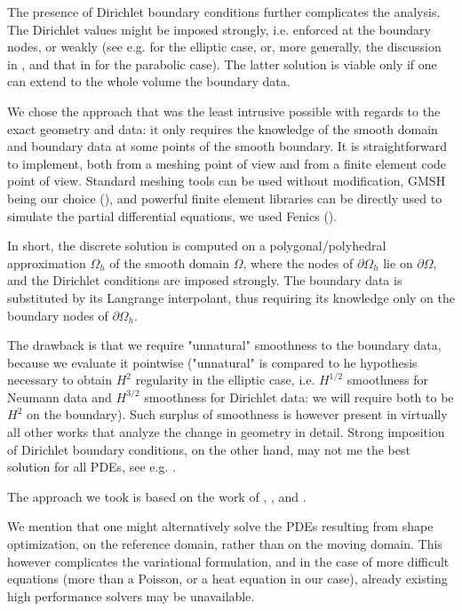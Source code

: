 \documentclass[english,a4paper,9pt,oneside]{scrbook}	%
\theoremstyle{break}
\theoremstyle{remark}
\begin{document}
\begin{appendices}
The presence of Dirichlet boundary conditions further complicates the analysis. The Dirichlet values might be imposed strongly, i.e. enforced at the boundary nodes, or weakly (see e.g. \cite{chiba} for the elliptic case, or, more generally, the discussion in \cite{chouly}, and that in \cite{benner} for the parabolic case). The latter solution is viable only if one can extend to the whole volume the boundary data.

We chose the approach that was the least intrusive possible with regards to the exact geometry and data: it only requires the knowledge of the smooth domain and boundary data at some points of the smooth boundary. It is straightforward to implement, both from a meshing point of view and from a finite element code point of view. Standard meshing tools can be used without modification, GMSH being our choice (\cite{gmsh}), and powerful finite element libraries can be directly used to simulate the partial differential equations, we used Fenics (\cite{fenics}).

In short, the discrete solution is computed on a polygonal/polyhedral approximation $\Omega_h$ of the smooth domain $\Omega$, where the nodes of $\partial \Omega_h$ lie on $\partial \Omega$, and the Dirichlet conditions are imposed strongly. The boundary data is substituted by its Langrange interpolant, thus requiring its knowledge only on the boundary nodes of $\partial \Omega_h$.

The drawback is that we require "unnatural" smoothness to the boundary data, because we evaluate it pointwise ("unnatural" is compared to he hypothesis necessary to obtain $H^2$ regularity in the elliptic case, i.e. $H^{1/2}$ smoothness for Neumann data and $H^{3/2}$ smoothness for Dirichlet data: we will require both to be $H^2$ on the boundary). Such surplus of smoothness is however present in virtually all other works that analyze the change in geometry in detail. Strong imposition of Dirichlet boundary conditions, on the other hand, may not me the best solution for all PDEs, see e.g. \cite{hughes}.

The approach we took is based on the work of \cite{elliott}, \cite{ranner}, \cite{bernardi} and \cite{edelmann}.

We mention that one might alternatively solve the PDEs resulting from shape optimization, on the reference domain, rather than on the moving domain. This however complicates the variational formulation, and in the case of more difficult equations (more than a Poisson, or a heat equation in our case), already existing high performance solvers may be unavailable.



\end{appendices}
\end{document}
